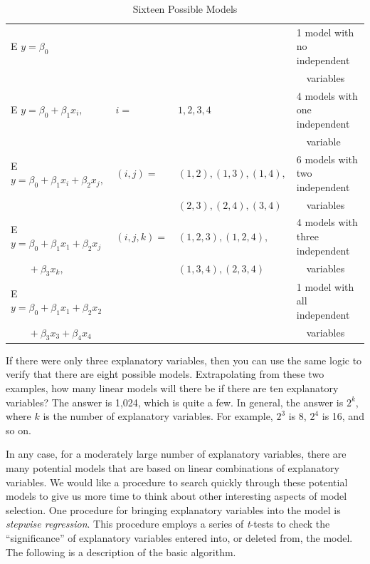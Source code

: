 \begin{table}[h]

\caption{\label{T5:NumberModels} Sixteen Possible Models}
\begin{tabular}{llll}
\hline
E $y=\beta_0$ &  &  & 1 model with no independent \\
&  &  & \ \ variables \\
E $y=\beta_0+\beta_1x_i,$ & $i=$ & $1,2,3,4$ & 4 models with one
independent \\
&  &  & \ \ variable \\
E $y = \beta_0 + \beta_1 x_i + \beta_2 x_j,$ & $(i,j)=$ & $
(1,2),(1,3),(1,4),$ & 6 models with two independent \\
&  & $(2,3),(2,4),(3,4)$ & \ \ variables \\
E $y = \beta_0 + \beta_1 x_1 + \beta_2 x_j$ & $(i,j,k)=$ & $
(1,2,3),(1,2,4),$ & 4 models with three independent \\
$\ \ \ \ \ \ \ \ +\beta_3x_{k},$ &  & $(1,3,4),(2,3,4)$ & \ \
variables
\\
E $y = \beta_0 + \beta_1 x_1 + \beta_2 x_2$ &  &  & 1 model with all
independent \\
$\ \ \ \ \ \ \ \ +\beta_3 x_3 + \beta_4 x_4$ &  &  & \ \ variables \\
\hline
\end{tabular}
\end{table}


\noindent If there were only three explanatory variables, then you
can use the same logic to verify that there are eight possible
models. Extrapolating from these two examples, how many linear
models will there be if there are ten explanatory variables? The
answer is 1,024, which is quite a few. In general, the answer is
$2^k$, where $k$ is the number of explanatory variables. For
example, $2^3$ is 8, $2^4$ is 16, and so on.

In any case, for a moderately large number of explanatory variables,
there are many potential models that are based on linear
combinations of explanatory variables. We would like a procedure to
search quickly through these potential models to give us more time
to think about other interesting aspects of model selection. One
procedure for bringing explanatory variables into the model is
\textit{stepwise regression}. This procedure employs a series of
\textit{t}-tests to check the ``significance'' of explanatory
variables entered into, or deleted from, the model. The following is
a description of the basic algorithm.

